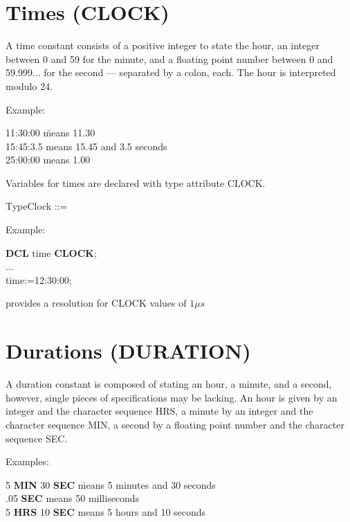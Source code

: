 \section{Times (CLOCK)}   %

A time constant consists of a positive integer to state the hour, an
integer between 0 and 59 for the minute, and a floating point number
between 0 and 59.999... for the second --- separated by a colon, each.
The hour is interpreted modulo 24.

Example:

\begin{tabbing}
11:30:00 \x \= means 11.30\\
15:45:3.5   \> means 15.45 and 3.5 seconds\\
25:00:00    \> means 1.00
\end{tabbing}

Variables for times are declared with type attribute CLOCK.

TypeClock ::=\\

Example:

{\bf DCL} time {\bf CLOCK};\\
...\\
time:=12:30:00;

\begin{added}
\OpenPEARL{} provides a resolution for CLOCK values of $1\mu s$
\end{added}

\section{Durations (DURATION)}   %

A duration constant is composed of stating an hour, a minute, and a
second, however, single pieces of specifications may be lacking. An hour
is given by an integer and the character sequence HRS, a minute by an
integer and the character sequence MIN, a second by a floating point
number and the character sequence SEC.

Examples:

\begin{tabbing}
5 {\bf MIN} 30 {\bf SEC} \= means 5 minutes and 30 seconds \\
.05 {\bf SEC}            \> means 50 milliseconds \\
5 {\bf HRS} 10 {\bf SEC} \> means 5 hours and 10 seconds
\end{tabbing}

